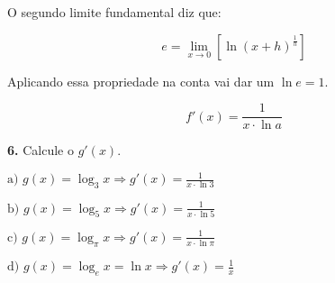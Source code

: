 \documentclass[article,12pt,oneside,a4paper,brazil]{abntex2}
\begin{document}
\begin{flushleft}
		O segundo limite fundamental diz que:
		
		\begin{equation*}
			e = \lim_{x \rightarrow 0} \left[ \ln \left( {x + h}\right)^{\frac{1}{h}} \right]
		\end{equation*}
		
		Aplicando essa propriedade na conta vai dar um $\ln{e} = 1$.
		
		\begin{equation*}
			f'(x) = \frac{1}{x \cdot \ln{a}}
		\end{equation*}
		
		
		\vspace{1em}
		
		\textbf{6.} Calcule o $g'(x)$.
		
		\begin{adjustwidth}{0.5cm}{0cm}
			$\text{a) } g(x) = \log_{3}{x} \Rightarrow g'(x) = \frac{1}{x \cdot \ln{3}}$
			
			$\text{b) } g(x) = \log_{5}{x} \Rightarrow g'(x) = \frac{1}{x \cdot \ln{5}}$
			
			$\text{c) } g(x) = \log_{\pi}{x} \Rightarrow g'(x) = \frac{1}{x \cdot \ln{\pi}}$
			
			$\text{d) } g(x) = \log_{e}{x} = \ln{x} \Rightarrow g'(x) = \frac{1}{x}$
		\end{adjustwidth}	
		\vspace{1em}
	\end{flushleft}
	

	
	
\end{document}

